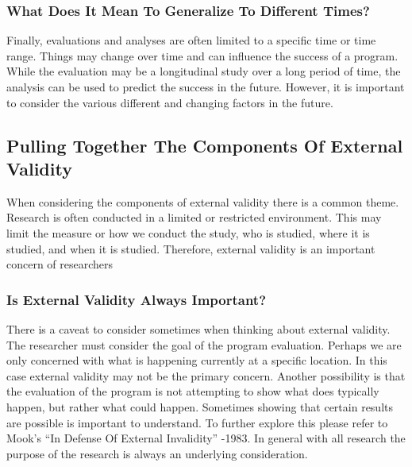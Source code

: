 \documentclass[]{book}
\theoremstyle{definition}
\theoremstyle{definition}
\theoremstyle{definition}
\theoremstyle{remark}
\begin{document}
\hypertarget{what-does-it-mean-to-generalize-to-different-times}{%
\subsubsection{What Does It Mean To Generalize To Different
Times?}\label{what-does-it-mean-to-generalize-to-different-times}}

Finally, evaluations and analyses are often limited to a specific time
or time range. Things may change over time and can influence the success
of a program. While the evaluation may be a longitudinal study over a
long period of time, the analysis can be used to predict the success in
the future. However, it is important to consider the various different
and changing factors in the future.

\hypertarget{pulling-together-the-components-of-external-validity}{%
\subsection{Pulling Together The Components Of External
Validity}\label{pulling-together-the-components-of-external-validity}}

When considering the components of external validity there is a common
theme. Research is often conducted in a limited or restricted
environment. This may limit the measure or how we conduct the study, who
is studied, where it is studied, and when it is studied. Therefore,
external validity is an important concern of researchers

\hypertarget{is-external-validity-always-important}{%
\subsubsection{Is External Validity Always
Important?}\label{is-external-validity-always-important}}

There is a caveat to consider sometimes when thinking about external
validity. The researcher must consider the goal of the program
evaluation. Perhaps we are only concerned with what is happening
currently at a specific location. In this case external validity may not
be the primary concern. Another possibility is that the evaluation of
the program is not attempting to show what does typically happen, but
rather what could happen. Sometimes showing that certain results are
possible is important to understand. To further explore this please
refer to Mook's ``In Defense Of External Invalidity'' -1983. In general
with all research the purpose of the research is always an underlying
consideration.
\end{document}
